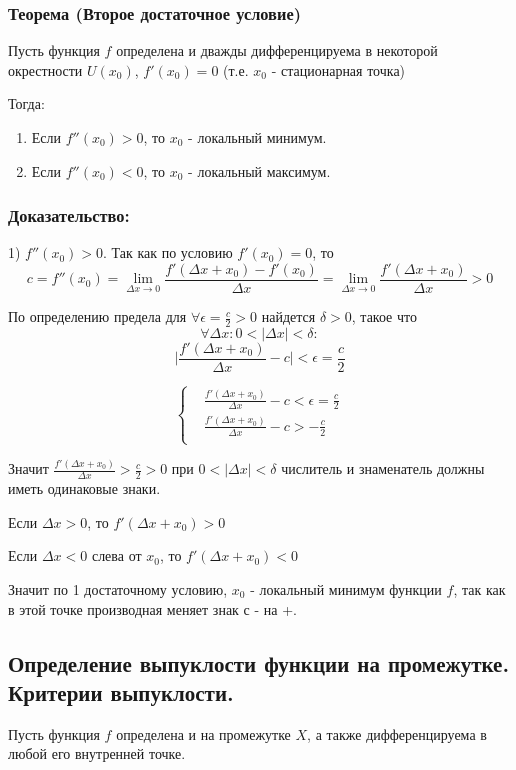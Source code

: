 \documentclass[a4paper,12pt]{article}
\theoremstyle{plain} %
\theoremstyle{definition} %
\theoremstyle{remark} %
\begin{document}
\subsubsection*{Теорема (Второе достаточное условие)}

Пусть функция $f$ определена и дважды дифференцируема в некоторой окрестности $U(x_0)$, $f'(x_0) = 0$ (т.е. $x_0$ - стационарная точка)

Тогда:
\begin{enumerate}
	\item Если $f''(x_0) > 0$, то $x_0$ - локальный минимум.
	\item Если $f''(x_0) < 0$, то $x_0$ - локальный максимум.
\end{enumerate}

\subsubsection*{Доказательство:}

1) $f''(x_0) > 0$. Так как по условию $f'(x_0) = 0$, то
\[ c = f''(x_0) = \lim_{\Delta x \rightarrow 0} \frac{f'(\Delta x + x_0) - f'(x_0)}{\Delta x} = \lim_{\Delta x \rightarrow 0} \frac{f'(\Delta x + x_0)}{\Delta x} > 0 \]

По определению предела для $\forall \epsilon = \frac{c}{2} > 0$ найдется $\delta > 0$, такое что
\[ \forall \Delta x: 0 < |\Delta x| < \delta : \]
\[ \Big| \frac{f'(\Delta x + x_0)}{\Delta x} - c \Big| < \epsilon = \frac{c}{2} \]

\[
	\begin{cases}
		 & \frac{f'(\Delta x + x_0)}{\Delta x} - c < \epsilon = \frac{c}{2} \\
		 & \frac{f'(\Delta x + x_0)}{\Delta x} - c > - \frac{c}{2}          \\
	\end{cases}
\]

Значит $\frac{f'(\Delta x + x_0)}{\Delta x} > \frac{c}{2} > 0$ при $0 < |\Delta x| < \delta$ числитель и знаменатель должны иметь одинаковые знаки.

Если $\Delta x > 0$, то $f'(\Delta x + x_0) > 0$

Если $\Delta x < 0$ слева от $x_0$, то $f'(\Delta x + x_0) < 0$

Значит по 1 достаточному условию, $x_0$ - локальный минимум функции $f$, так как в этой точке производная меняет знак с - на +.


\newpage
\subsection*{Определение выпуклости функции на промежутке. Критерии выпуклости.                                       }
Пусть функция $f$ определена и на промежутке $X$, а также дифференцируема в любой его внутренней точке.
\end{document}
